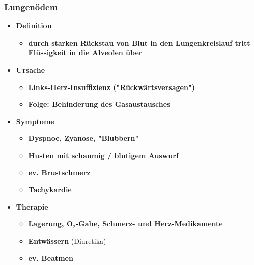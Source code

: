 \pagebreak
	\subsubsection{Lungenödem}
		\begin{itemize}
			\item \textbf{Definition}
					\begin{itemize}
						\item \textbf{durch starken Rückstau von Blut in den Lungenkreislauf tritt Flüssigkeit in die Alveolen über}
					\end{itemize}
			\item \textbf{Ursache}
					\begin{itemize}
						\item \textbf{Links-Herz-Insuffizienz ("Rückwärtsversagen")}
						\item \textbf{Folge: Behinderung des Gasaustausches}
					\end{itemize}
			\item \textbf{Symptome}
					\begin{itemize}
						\item \textbf{Dyspnoe, Zyanose, "Blubbern"}
						\item \textbf{Husten mit schaumig / blutigem Auswurf}
						\item \textbf{ev. Brustschmerz}
						\item \textbf{Tachykardie}
					\end{itemize}
			\item \textbf{Therapie}
					\begin{itemize}
						\item \textbf{Lagerung, O$_2$-Gabe, Schmerz- und Herz-Medikamente}
						\item \textbf{Entwässern} (Diuretika)
						\item \textbf{ev. Beatmen}
					\end{itemize}
		\end{itemize}